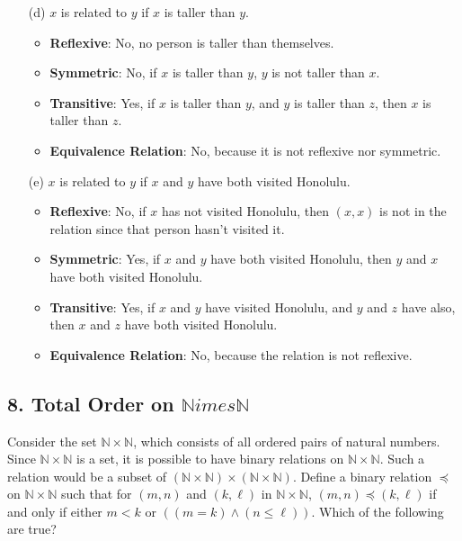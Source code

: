\documentclass{article}
\begin{document}
\begin{enumerate}
    \item[(d)] $x$ is related to $y$ if $x$ is taller than $y$.
    \begin{itemize}
        \item \textbf{Reflexive}: No, no person is taller than themselves.
        \item \textbf{Symmetric}: No, if \( x \) is taller than \( y \), \( y \) is not taller than \( x \).
        \item \textbf{Transitive}: Yes, if \( x \) is taller than \( y \), and \( y \) is taller than \( z \), then \( x \) is taller than \( z \).
        \item \textbf{Equivalence Relation}: No, because it is not reflexive nor symmetric.
    \end{itemize}

    \item[(e)] \( x \) is related to \( y \) if \( x \) and \( y \) have both visited Honolulu.
    \begin{itemize}
        \item \textbf{Reflexive}: No, if $x$ has not visited Honolulu, then $(x,x)$ is not in the relation since that person hasn't visited it.
        \item \textbf{Symmetric}: Yes, if \( x \) and \( y \) have both visited Honolulu, then \( y \) and \( x \) have both visited Honolulu.
        \item \textbf{Transitive}: Yes, if \( x \) and \( y \) have visited Honolulu, and \( y \) and \( z \) have also, then \( x \) and \( z \) have both visited Honolulu.
        \item \textbf{Equivalence Relation}: No, because the relation is not reflexive.
    \end{itemize}
\end{enumerate}

\subsection*{8. Total Order on $\mathbb{N} 	imes \mathbb{N}$}

Consider the set $\mathbb{N} \times \mathbb{N}$, which consists of all ordered pairs of natural numbers. Since $\mathbb{N} \times \mathbb{N}$ is a set, it is possible to have binary relations on $\mathbb{N} \times \mathbb{N}$. Such a relation would be a subset of $(\mathbb{N} \times \mathbb{N}) \times (\mathbb{N} \times \mathbb{N})$. Define a binary relation $\preceq$ on $\mathbb{N} \times \mathbb{N}$ such that for $(m,n)$ and $(k,\ell)$ in $\mathbb{N} \times \mathbb{N}$, $(m,n) \preceq (k,\ell)$ if and only if either $m < k$ or $((m = k) \land (n \leq \ell))$. Which of the following are true?
\end{document}
